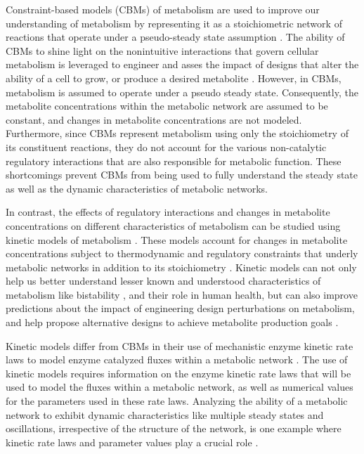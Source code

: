 \documentclass[10pt]{article}
\begin{document}
	Constraint-based models (CBMs) of metabolism are used to improve our understanding of metabolism by representing it as a stoichiometric network of reactions that operate under a pseudo-steady state assumption \parencite{Bordbar2014a}. The ability of CBMs to shine light on the nonintuitive interactions that govern cellular metabolism is leveraged to engineer and asses the impact of designs that alter the ability of a cell to grow, or produce a desired metabolite \parencite{Maia2016}. However, in CBMs, metabolism is assumed to operate under a pseudo steady state. Consequently, the metabolite concentrations within the metabolic network are assumed to be constant, and changes in metabolite concentrations are not modeled. Furthermore, since CBMs represent metabolism using only the stoichiometry of its constituent reactions, they do not account for the various non-catalytic regulatory interactions that are also responsible for metabolic function. These shortcomings prevent CBMs from being used to fully understand the steady state as well as the dynamic characteristics of metabolic networks. 
	
	In contrast, the effects of regulatory interactions and changes in metabolite concentrations on different characteristics of metabolism can be studied using kinetic models of metabolism \parencite{Saa2017}. These models account for changes in metabolite concentrations subject to thermodynamic and regulatory constraints that underly metabolic networks in addition to its stoichiometry \parencite{Link2014}. Kinetic models can not only help us better understand lesser known and understood characteristics of metabolism like bistability \parencite{Kotte2014}, and their role in human health, but can also improve predictions about the impact of engineering design perturbations on metabolism, and help propose alternative designs to achieve metabolite production goals \parencite{Khodayari2016}. 
	
	Kinetic models differ from CBMs in their use of mechanistic enzyme kinetic rate laws to model enzyme catalyzed fluxes within a metabolic network \parencite{Srinivasan2015,Saa2017}. The use of kinetic models requires information on the enzyme kinetic rate laws that will be used to model the fluxes within a metabolic network, as well as numerical values for the parameters used in these rate laws. Analyzing the ability of a metabolic network to exhibit dynamic characteristics like multiple steady states and oscillations, irrespective of the structure of the network, is one example where kinetic rate laws and parameter values play a crucial role \parencite{Srinivasan2017}. 
	
\end{document}
